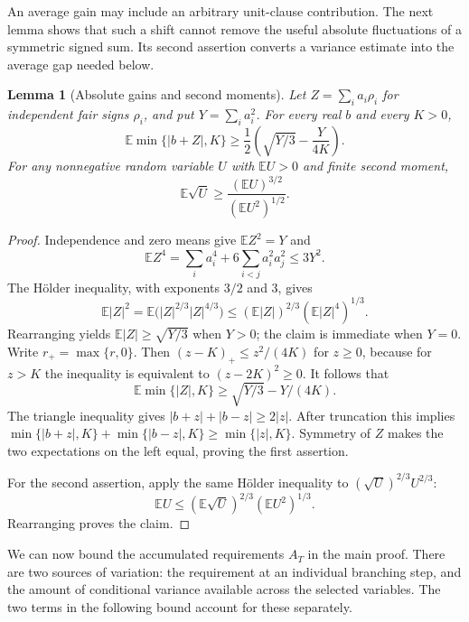 \documentclass[11pt,a4paper]{article}
\newtheorem{lemma}[theorem]{Lemma}
\theoremstyle{definition}
\theoremstyle{remark}
\newcommand{\E}{\mathbb E}
\begin{document}
An average gain may include an arbitrary unit-clause contribution.
The next lemma shows that such a shift cannot remove the useful absolute
fluctuations of a symmetric signed sum. Its second assertion converts a
variance estimate into the average gap needed below.

\begin{lemma}[Absolute gains and second moments]\label{lem:random_moments}
Let $Z=\sum_i a_i\rho_i$ for independent fair signs $\rho_i$, and put
$Y=\sum_i a_i^2$. For every real $b$ and every $K>0$,
\[
 \E\min\{|b+Z|,K\}
 \ge\frac12\left(\sqrt{Y/3}-\frac{Y}{4K}\right).
\]
For any nonnegative random variable $U$ with $\E U>0$ and finite second
moment,
\[
 \E\sqrt U\ge\frac{(\E U)^{3/2}}{(\E U^2)^{1/2}}.
\]
\end{lemma}
\begin{proof}
Independence and zero means give $\E Z^2=Y$ and
\[
 \E Z^4=\sum_i a_i^4+6\sum_{i<j}a_i^2a_j^2\le3Y^2.
\]
The H\"older inequality, with exponents $3/2$ and $3$, gives
\[
 \E|Z|^2
 =\E\bigl(|Z|^{2/3}|Z|^{4/3}\bigr)
 \le(\E|Z|)^{2/3}(\E|Z|^4)^{1/3}.
\]
Rearranging yields $\E|Z|\ge\sqrt{Y/3}$ when $Y>0$;
the claim is immediate when $Y=0$.
Write $r_+=\max\{r,0\}$. Then $(z-K)_+\le z^2/(4K)$ for $z\ge0$,
because for $z>K$
the inequality is equivalent to $(z-2K)^2\ge0$.
It follows that
\[
 \E\min\{|Z|,K\}\ge\sqrt{Y/3}-Y/(4K).
\]
The triangle inequality gives $|b+z|+|b-z|\ge2|z|$.
After truncation this implies
$\min\{|b+z|,K\}+\min\{|b-z|,K\}\ge\min\{|z|,K\}$.
Symmetry of $Z$ makes the two expectations on the left equal,
proving the first assertion.

For the second assertion, apply the same H\"older inequality to
$(\sqrt U)^{2/3}U^{2/3}$:
\[
 \E U\le(\E\sqrt U)^{2/3}(\E U^2)^{1/3}.
\]
Rearranging proves the claim.
\end{proof}

We can now bound the accumulated requirements $A_T$ in the main proof.
There are two sources of variation: the requirement at an individual
branching step, and the amount of conditional variance available across
the selected variables. The two terms in the following bound account
for these separately.
\end{document}

